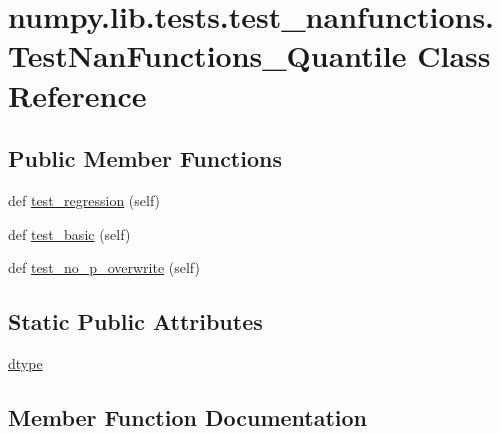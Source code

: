 \hypertarget{classnumpy_1_1lib_1_1tests_1_1test__nanfunctions_1_1TestNanFunctions__Quantile}{}\section{numpy.\+lib.\+tests.\+test\+\_\+nanfunctions.\+Test\+Nan\+Functions\+\_\+\+Quantile Class Reference}
\label{classnumpy_1_1lib_1_1tests_1_1test__nanfunctions_1_1TestNanFunctions__Quantile}
\subsection*{Public Member Functions}
\begin{DoxyCompactItemize}
\item 
def \hyperlink{classnumpy_1_1lib_1_1tests_1_1test__nanfunctions_1_1TestNanFunctions__Quantile_a7b9a10c1d327c39e3fab909e2b08addb}{test\+\_\+regression} (self)
\item 
def \hyperlink{classnumpy_1_1lib_1_1tests_1_1test__nanfunctions_1_1TestNanFunctions__Quantile_a1dc688f51e5c8266349085fe2b164298}{test\+\_\+basic} (self)
\item 
def \hyperlink{classnumpy_1_1lib_1_1tests_1_1test__nanfunctions_1_1TestNanFunctions__Quantile_acd1a0c3da675e6e3c9f407c0a420dd1e}{test\+\_\+no\+\_\+p\+\_\+overwrite} (self)
\end{DoxyCompactItemize}
\subsection*{Static Public Attributes}
\begin{DoxyCompactItemize}
\item 
\hyperlink{classnumpy_1_1lib_1_1tests_1_1test__nanfunctions_1_1TestNanFunctions__Quantile_a041cddc6aea7b536313a7b42b1046018}{dtype}
\end{DoxyCompactItemize}


\subsection{Member Function Documentation}
\mbox{\label{classnumpy_1_1lib_1_1tests_1_1test__nanfunctions_1_1TestNanFunctions__Quantile_a1dc688f51e5c8266349085fe2b164298}} 
